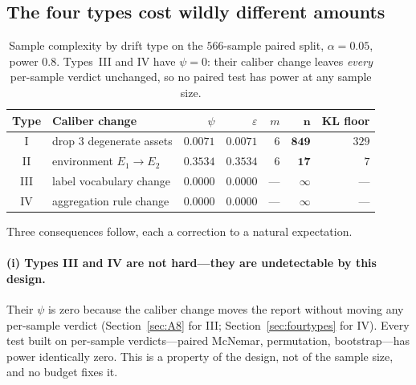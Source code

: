 \documentclass{article}
\begin{document}
\subsection{The four types cost wildly different amounts}
\label{sec:sampleresults}

\begin{table}[t]
\centering
\small
\caption{Sample complexity by drift type on the $566$-sample paired split, $\alpha=0.05$, power $0.8$.
Types~III and IV have $\psi=0$: their caliber change leaves \emph{every} per-sample verdict unchanged, so
no paired test has power at any sample size.}
\label{tab:sample}
\begin{tabular}{@{}c p{4.6cm} r r r r r@{}}
\toprule
Type & Caliber change & $\psi$ & $\varepsilon$ & $m$ & $\mathbf{n}$ & KL floor \\
\midrule
I & drop 3 degenerate assets & $0.0071$ & $0.0071$ & $6$ & $\mathbf{849}$ & $329$ \\
II & environment $E_1\to E_2$ & $0.3534$ & $0.3534$ & $6$ & $\mathbf{17}$ & $7$ \\
III & label vocabulary change & $0.0000$ & $0.0000$ & --- & $\boldsymbol{\infty}$ & --- \\
IV & aggregation rule change & $0.0000$ & $0.0000$ & --- & $\boldsymbol{\infty}$ & --- \\
\bottomrule
\end{tabular}
\end{table}

Three consequences follow, each a correction to a natural expectation.

\paragraph{(i) Types III and IV are not hard---they are undetectable by this design.} Their $\psi$ is zero
because the caliber change moves the report without moving any per-sample verdict
(Section~\ref{sec:A8} for III; Section~\ref{sec:fourtypes} for IV). Every test built on per-sample
verdicts---paired McNemar, permutation, bootstrap---has power identically zero. This is a property of the
design, not of the sample size, and no budget fixes it.
\end{document}
